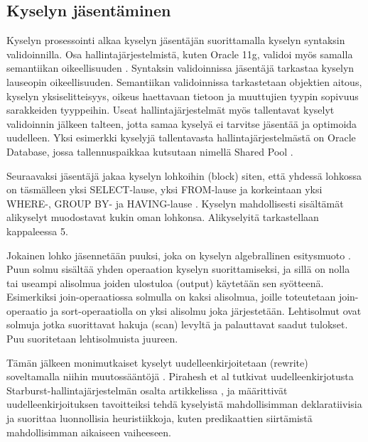 \documentclass[finnish]{tktltiki2}
\theoremstyle{definition}
\theoremstyle{remark}
\begin{document}
\subsection{Kyselyn jäsentäminen}
Kyselyn prosessointi alkaa kyselyn jäsentäjän suorittamalla kyselyn syntaksin validoinnilla. \cite{selinger1979access} Osa hallintajärjestelmistä, kuten Oracle 11g, validoi myös samalla semantiikan oikeellisuuden \cite{oracle2009doc}. 
Syntaksin validoinnissa jäsentäjä tarkastaa kyselyn lauseopin oikeellisuuden. Semantiikan validoinnissa tarkastetaan objektien aitous, kyselyn yksiselitteisyys, oikeus haettavaan tietoon ja muuttujien tyypin sopivuus sarakkeiden tyyppeihin. Useat hallintajärjestelmät myös
tallentavat kyselyt validoinnin jälkeen talteen, jotta samaa kyselyä ei tarvitse jäsentää ja optimoida uudelleen. Yksi esimerkki kyselyjä tallentavasta hallintajärjestelmästä on Oracle Database, jossa tallennuspaikkaa kutsutaan nimellä Shared Pool \cite{oracle2005doc}. 

Seuraavaksi jäsentäjä jakaa kyselyn lohkoihin (block) siten, että yhdessä lohkossa on täsmälleen yksi SELECT-lause, yksi FROM-lause ja korkeintaan yksi WHERE-, GROUP BY- ja HAVING-lause \cite{ramakrishnan2003database}. 
Kyselyn mahdollisesti sisältämät alikyselyt muodostavat kukin oman lohkonsa. Alikyselyitä tarkastellaan kappaleessa 5.

Jokainen lohko jäsennetään puuksi, joka on kyselyn algebrallinen esitysmuoto \cite{mahajan2012}. 
Puun solmu sisältää yhden operaation kyselyn suorittamiseksi, ja sillä on nolla tai useampi alisolmua joiden ulostuloa (output) käytetään sen syötteenä.
Esimerkiksi join-operaatiossa solmulla on kaksi alisolmua, joille toteutetaan join-operaatio ja sort-operaatiolla on yksi alisolmu joka järjestetään.
Lehtisolmut ovat solmuja jotka suorittavat hakuja (scan) levyltä ja palauttavat saadut tulokset. 
Puu suoritetaan lehtisolmuista juureen.

Tämän jälkeen monimutkaiset kyselyt uudelleenkirjoitetaan (rewrite) soveltamalla niihin muutossääntöjä \cite{ioannidis1996query}. Pirahesh et al tutkivat uudelleenkirjotusta Starburst-hallintajärjestelmän osalta artikkelissa \cite{pirahesh1992extensible}, ja määrittivät uudelleenkirjoituksen tavoitteiksi tehdä kyselyistä mahdollisimman deklaratiivisia ja suorittaa luonnollisia heuristiikkoja, kuten predikaattien siirtämistä mahdollisimman aikaiseen vaiheeseen.

\end{document}

